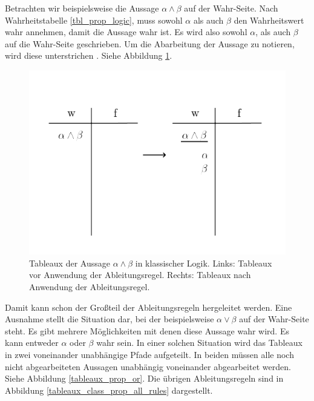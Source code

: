 Betrachten wir beispielsweise die Aussage $\alpha\wedge\beta$ auf der Wahr-Seite. Nach Wahrheitstabelle \ref{tbl_prop_logic}, muss sowohl $\alpha$ als auch $\beta$ den Wahrheitswert wahr annehmen, damit die Aussage wahr ist. Es wird also sowohl $\alpha$, als auch $\beta$ auf die Wahr-Seite geschrieben. Um die Abarbeitung der Aussage zu notieren, wird diese unterstrichen \cite{KB14}. Siehe Abbildung \ref{tableaux_prop_and}.

\begin{figure}
\begin{center}
\includegraphics[scale=0.7]{images/Tableaux_And_Prop_Logic.png}
\caption{Tableaux der Aussage $\alpha\wedge\beta$ in klassischer Logik. Links: Tableaux vor Anwendung der Ableitungsregel. Rechts: Tableaux nach Anwendung der Ableitungsregel.}
\label{tableaux_prop_and}
\end{center}
\end{figure}

Damit kann schon der Großteil der Ableitungsregeln hergeleitet werden. Eine Ausnahme stellt die Situation dar, bei der beispielsweise $\alpha\vee\beta$ auf der Wahr-Seite steht. Es gibt mehrere Möglichkeiten mit denen diese Aussage wahr wird. Es kann entweder $\alpha$ oder $\beta$ wahr sein. In einer solchen Situation wird das Tableaux in zwei voneinander unabhängige Pfade aufgeteilt. In beiden müssen alle noch nicht abgearbeiteten Aussagen unabhängig voneinander abgearbeitet werden. Siehe Abbildung \ref{tableaux_prop_or}. Die übrigen Ableitungsregeln sind in Abbildung \ref{tableaux_class_prop_all_rules} dargestellt.

